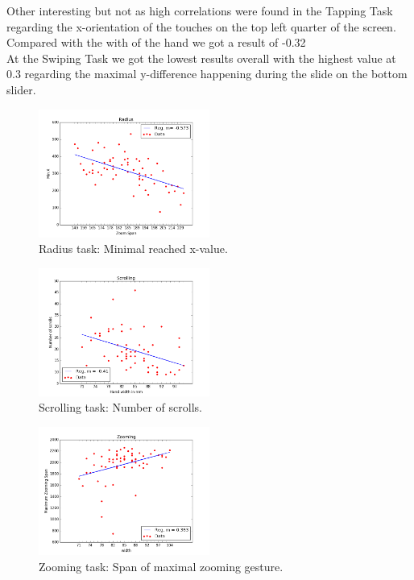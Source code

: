 \documentclass{sigchi}
\begin{document}
Other interesting but not as high correlations were found in the Tapping Task regarding the x-orientation of the touches on the top left quarter of the screen. Compared with the with of the hand we got a result of -0.32\\
At the Swiping Task we got the lowest results overall with the highest value at 0.3 regarding the maximal y-difference happening during the slide on the bottom slider.

\begin{figure}[ht!]
	\centering
  \includegraphics[width=0.5\textwidth]{figures/plotRadius.png}
	\caption{Radius task: Minimal reached x-value.}
	\label{plotRadius}
\end{figure}

\begin{figure}[ht!]
	\centering
  \includegraphics[width=0.5\textwidth]{figures/plotScrolling.png}
	\caption{Scrolling task: Number of scrolls.}
	\label{plotScrolling}
\end{figure}

\begin{figure}[ht!]
	\centering
  \includegraphics[width=0.5\textwidth]{figures/plotZooming02.png}
	\caption{Zooming task: Span of maximal zooming gesture.}
	\label{plotZooming}
\end{figure}
\end{document}
